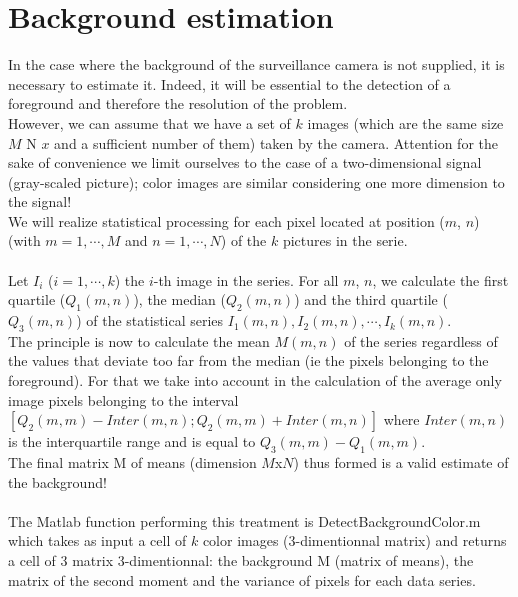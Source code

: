 \section{Background estimation}

In the case where the background of the surveillance camera is not supplied, it is necessary to estimate it. Indeed, it will be essential to the detection of a foreground and therefore the resolution of the problem.
\\
However, we can assume that we have a set of $k$ images (which are the same size $M$ N $x$ and a sufficient number of them) taken by the camera. Attention for the sake of convenience we limit ourselves to the case of a two-dimensional signal (gray-scaled picture); color images are similar considering one more dimension to the signal!
\\
We will realize statistical processing for each pixel located at position ($m$, $n$) (with $m =1, \cdots, M$ and $n=1, \cdots, N$) of the $k$ pictures in the serie.
\\
\\
Let $I_i$ ($i=1,\cdots,k$) the $i$-th image in the series. For all $m$, $n$, we calculate the first quartile ($Q_1 (m, n)$), the median ($Q_2 (m, n) $) and the third quartile ($Q_3(m, n)$) of the statistical series $I_1(m, n), I_2(m, n), \cdots, I_k(m, n)$.
\\
The principle is now to calculate the mean $M(m, n)$ of the series regardless of the values ​​that deviate too far from the median (ie the pixels belonging to the foreground). For that we take into account in the calculation of the average only image pixels belonging to the interval $[Q_2 (m, m) - Inter (m, n); Q_2 (m, m) + Inter (m, n) ]$ where $Inter (m, n)$ is the interquartile range and is equal to $Q_3 (m, m) - Q_1 (m, m)$.
\\
The final matrix M of means (dimension $M$x$N$) thus formed  is a valid estimate of the background!
\\
\\
The Matlab function performing this treatment is DetectBackgroundColor.m which takes as input a cell of $ k$ color images (3-dimentionnal matrix) and returns a cell of 3 matrix 3-dimentionnal: the background M (matrix of means), the matrix of the second moment and the variance of pixels for each data series.
